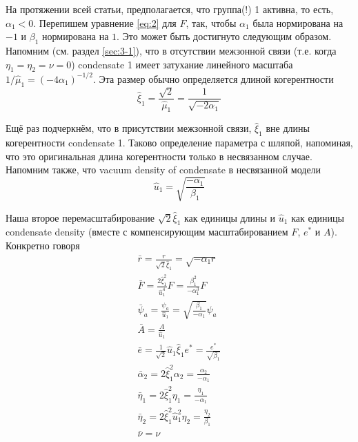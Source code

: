 На протяжении всей статьи, предполагается, что группа(!) 1
активна, то есть, \( \alpha_1 < 0 \). Перепишем уравнение \eqref{eq:2} для
\( F \), так, чтобы \( \alpha_1 \) была нормирована на \( -1 \) и
\( \beta_1 \) нормирована на \( 1 \). Это может быть достигнуто следующим
образом. Напомним (см. раздел \ref{sec:3-1}), что в отсутствии межзонной связи 
(т.е. когда \( \eta_1 = \eta_2 = \nu = 0 \)) condensate 1 имеет затухание 
линейного масштаба \( 1/\hat{\mu}_1 = (-4\alpha_1)^{-1/2} \). Эта размер обычно
определяется длиной когерентности
\begin{equation}
  \hat{\xi}_1 = \frac{\sqrt{2}}{\hat{\mu}_1} = \frac{1}{\sqrt{-2\alpha_1}}
  \label{eq:A-4}
\end{equation}

Ещё раз подчеркнём, что в присутствии межзонной связи, \( \hat{\xi}_1 \) вне
длины когерентности condensate 1. Таково определение параметра с шляпой,
напоминая, что это оригинальная длина когерентности только в несвязанном
случае. Напомним также, что vacuum density of condensate в несвязанной модели
\begin{equation}
  \hat{u}_1 = \sqrt{\frac{-\alpha_1}{\beta_1}}
  \label{eq:A-5}
\end{equation}

Наша второе перемасштабирование \( \sqrt{2}\hat{\xi}_1 \) как единицы длины
и \( \hat{u}_1 \) как единицы condensate density (вместе с компенсирующим
масштабированием \( F \), \( e^* \) и \( A \)). Конкретно говоря
\begin{gather}
  \bar{r} = \frac{r}{\sqrt{2}\hat{\xi}_1} = \sqrt{-\alpha_1 r} \nonumber \\
  \bar{F} = \frac{2\hat{\xi}^2_1}{\hat{u}^4_1}F =
    \frac{\beta^2_1}{-\alpha^3_1}F \nonumber \\
  \bar{\psi}_a = \frac{\psi_a}{\hat{u}_1} =
    \sqrt{\frac{\beta_1}{-\alpha_1}}\psi_a \nonumber \\
  \bar{A} = \frac{A}{\hat{u}_1} \\
  \bar{e} = \frac{1}{\sqrt{2}}\hat{u}_1\hat{\xi}_1 e^* =
    \frac{e^*}{\sqrt{\beta_1}} \nonumber \\
  \bar{\alpha}_2 = 2\hat{\xi}^2_1 \alpha_2 = \frac{\alpha_2}{-\alpha_1}
    \nonumber \\
  \bar{\eta}_1 = 2\hat{\xi}^2_1 \eta_1 = \frac{\eta_1}{-\alpha_1} \nonumber \\
  \bar{\eta}_2 = 2\hat{\xi}^2_1 \hat{u}^2_1 \eta_2 =
    \frac{\eta_2}{\beta_1} \nonumber \\
  \bar{\nu} = \nu \label{eq:A-6}
\end{gather}

